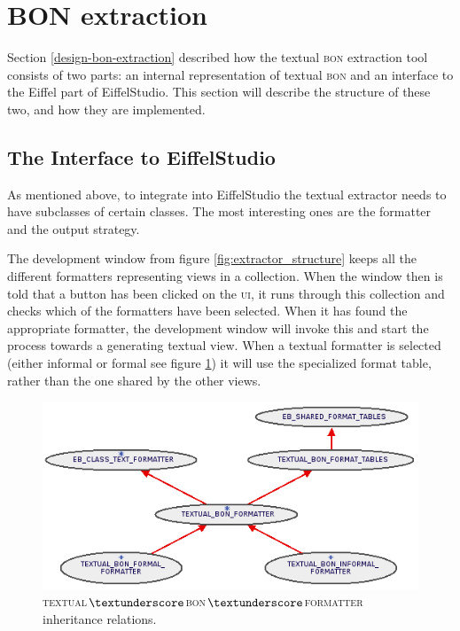 \section{BON extraction}
Section \ref{design-bon-extraction} described how the textual \textsc{bon} extraction tool consists of two parts: an internal representation of textual \textsc{bon} and an interface to the Eiffel part of EiffelStudio. This section will describe the structure of these two, and how they are implemented.
\subsection{The Interface to EiffelStudio}
\label{why_interface_takes_care_of_formal_and_informal}
As mentioned above, to integrate into EiffelStudio the textual \bon{} extractor needs to have subclasses of certain classes. The most interesting ones are the formatter and the output strategy. 

The development window from figure \ref{fig:extractor_structure} keeps all the different formatters representing views in a collection. When the window then is told that a button has been clicked on the \textsc{ui}, it runs through this collection and checks which of the formatters have been selected. When it has found the appropriate formatter, the development window will invoke this and start the process towards a generating textual view. When a textual \bon{} formatter is selected (either informal or formal see figure \ref{fig:textual_bon_formatter}) it will use the specialized \bon{} format table, rather than the one shared by the other views.

\begin{figure}[H]
\centerline{
\includegraphics[scale=0.7]{images/textual-bon-formatter.png}
}
\caption{\textsc{textual$\textunderscore$bon$\textunderscore$formatter} inheritance relations.}
\label{fig:textual_bon_formatter}
\end{figure}


